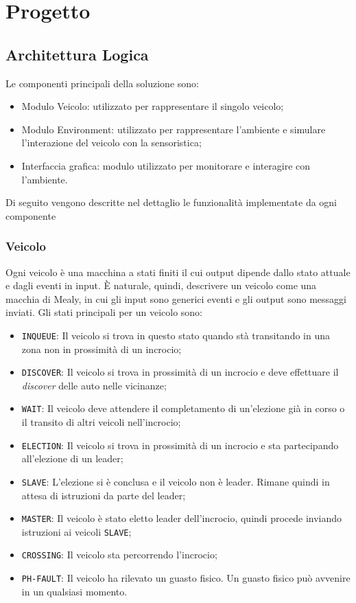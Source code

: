 \documentclass{memoir}
\begin{document}
\chapter{Progetto}

\section{Architettura Logica}
\label{sec:arclog}
Le componenti principali della soluzione sono:
\begin{itemize}
\item Modulo Veicolo: utilizzato per rappresentare il singolo veicolo;
\item Modulo Environment: utilizzato per rappresentare l'ambiente e simulare
  l'interazione del veicolo con la sensoristica;
\item Interfaccia grafica: modulo utilizzato per monitorare e interagire con
  l'ambiente.
\end{itemize}

Di seguito vengono descritte nel dettaglio le funzionalità implementate da ogni componente
\subsection{Veicolo}
Ogni veicolo è una macchina a stati finiti il cui output dipende dallo stato
attuale e dagli eventi in input. È naturale, quindi, descrivere un veicolo come
una macchia di Mealy, in cui gli input sono generici eventi e gli output sono
messaggi inviati. Gli stati principali per un veicolo sono:
\begin{itemize}
\item \texttt{INQUEUE}: Il veicolo si trova in questo stato quando stà
  transitando in una zona non in prossimità di un incrocio;
\item \texttt{DISCOVER}: Il veicolo si trova in prossimità di un incrocio e deve
  effettuare il \emph{discover} delle auto nelle vicinanze;
\item \texttt{WAIT}: Il veicolo deve attendere il completamento di un'elezione
  già in corso o il transito di altri veicoli nell'incrocio;
\item \texttt{ELECTION}: Il veicolo si trova in prossimità di un incrocio e sta
  partecipando all'elezione di un leader;
\item \texttt{SLAVE}: L'elezione si è conclusa e il veicolo non è leader. Rimane
  quindi in attesa di istruzioni da parte del leader;
\item \texttt{MASTER}: Il veicolo è stato eletto leader dell'incrocio, quindi
  procede inviando istruzioni ai veicoli \texttt{SLAVE};
\item \texttt{CROSSING}: Il veicolo sta percorrendo l'incrocio;
\item \texttt{PH-FAULT}: Il veicolo ha rilevato un guasto fisico. Un guasto
  fisico può avvenire in un qualsiasi momento.
\end{itemize}
\end{document}
